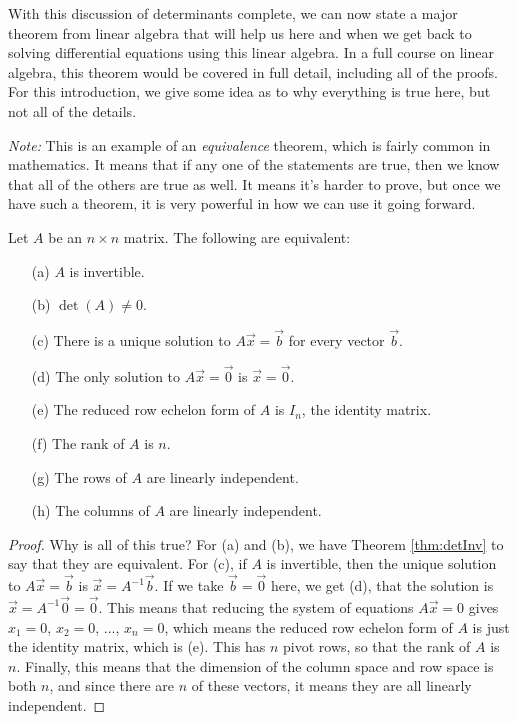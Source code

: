 With this discussion of determinants complete, we can now state a major theorem from linear algebra
that will help us here and when we get back to solving differential equations using this linear algebra. In a full course
on linear algebra, this theorem would be covered in full detail, including all of the proofs. For this introduction, we give some idea as to why everything is true here, but not all of the details.

\emph{Note:} This is an example of an \emph{equivalence} theorem, which is fairly common in mathematics. It means that if any one of the statements are true, then we know that all of the others are true as well. It means it's harder to prove, but once we have such a theorem, it is very powerful in how we can use it going forward.

\begin{theorem1}{}
Let $A$ be an $n \times n$ matrix. The following are equivalent:
\begin{enumerate}
\item[(a)] $A$ is invertible.
\item[(b)] $\det(A) \neq 0$.
\item[(c)] There is a unique solution to $A\vec{x} = \vec{b}$ for every vector $\vec{b}$.
\item[(d)] The only solution to $A\vec{x} = \vec{0}$ is $\vec{x} = \vec{0}$.
\item[(e)] The reduced row echelon form of $A$ is $I_n$, the identity matrix.
\item[(f)] The rank of $A$ is $n$.
\item[(g)] The rows of $A$ are linearly independent.
\item[(h)] The columns of $A$ are linearly independent.
\end{enumerate}
\end{theorem1}

\begin{proof}
Why is all of this true? For (a) and (b), we have Theorem \ref{thm:detInv} to say that they are equivalent. For (c), if $A$ is invertible, then the unique solution to $A\vec{x} = \vec{b}$ is $\vec{x} = A^{-1}\vec{b}$. If we take $\vec{b} = \vec{0}$ here, we get (d), that the solution is $\vec{x} = A^{-1}\vec{0} = \vec{0}$. This means that reducing the system of equations $A\vec{x} = 0$ gives $x_1 = 0$, $x_2 = 0$, ..., $x_n = 0$, which means the reduced row echelon form of $A$ is just the identity matrix, which is (e). This has $n$ pivot rows, so that the rank of $A$ is $n$. Finally, this means that the dimension of the column space and row space is both $n$, and since there are $n$ of these vectors, it means they are all linearly independent.
\end{proof}


